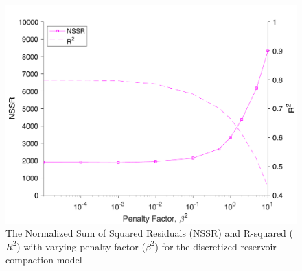\documentclass[draft,grl]{agutexSI2019}
\begin{document}
\begin{article}
\begin{figure}
	\centering
	\includegraphics[width=\textwidth]{figures/supplement/figureS12-reservoir-nssr.pdf}
	\caption{The Normalized Sum of Squared Residuals (NSSR) and R-squared ($ R^2 $) with varying penalty factor ($ \beta^2 $) for the discretized reservoir compaction model
	}
	\label{fig:model-reservoir-nssr}
\end{figure}

% 
 

%
%
\end{article}
\clearpage
\end{document}
